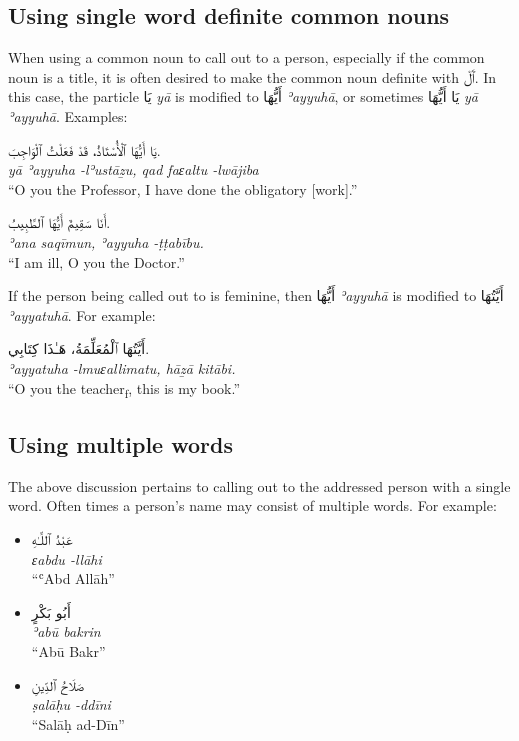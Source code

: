 \documentclass[
  10pt,
]{book}
\begin{document}
\subsection{Using single word definite common nouns}\label{using-single-word-definite-common-nouns}

When using a common noun to call out to a person, especially if the common noun is a title, it is often desired to make the common noun definite with \foreignlanguage{arabic}{ٱَلْ}. In this case, the particle \foreignlanguage{arabic}{يَا} \emph{yā} is modified to \foreignlanguage{arabic}{أَيُّهَا} \emph{ʾayyuhā}, or sometimes \foreignlanguage{arabic}{يَا أَيُّهَا} \emph{yā ʾayyuhā}. Examples:

\foreignlanguage{arabic}{يَا أَيُّهَا ٱلْأُسْتَاذُ، قَدْ فَعَلْتُ ٱلْوَاجِبَ.}\\
\emph{yā ʾayyuha -lʾustāẕu, qad faɛaltu -lwājiba}\\
\enquote{O you the Professor, I have done the obligatory {[}work{]}.}

\foreignlanguage{arabic}{أَنَا سَقِيمٌ أَيُّهَا ٱلطَّبِيبُ.}\\
\emph{ʾana saqīmun, ʾayyuha -ṭṭabību.}\\
\enquote{I am ill, O you the Doctor.}

If the person being called out to is feminine, then \foreignlanguage{arabic}{أَيُّهَا} \emph{ʾayyuhā} is modified to \foreignlanguage{arabic}{أَيَّتُهَا} \emph{ʾayyatuhā}. For example:

\foreignlanguage{arabic}{أَيَّتُهَا ٱلْمُعَلِّمَةُ، هَـٰذَا کِتَابِي.}\\
\emph{ʾayyatuha -lmuɛallimatu, hāẕā kitābi.}\\
\enquote{O you the teacher\textsubscript{f}, this is my book.}

\subsection{Using multiple words}\label{using-multiple-words}

The above discussion pertains to calling out to the addressed person with a single word. Often times a person's name may consist of multiple words. For example:

\begin{itemize}
\item
  \foreignlanguage{arabic}{عَبْدُ ٱللَّـٰهِ}\\
  \emph{ɛabdu -llāhi}\\
  \enquote{ʿAbd Allāh}
\item
  \foreignlanguage{arabic}{أَبُو بَکْرٍ}\\
  \emph{ʾabū bakrin}\\
  \enquote{Abū Bakr}
\item
  \foreignlanguage{arabic}{صَلَاحُ ٱلدِّينِ}\\
  \emph{ṣalāḥu -ddīni}\\
  \enquote{Salāḥ ad-Dīn}
\end{itemize}
\end{document}
